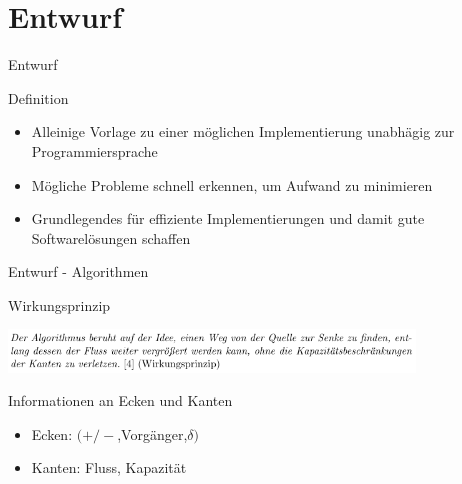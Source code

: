 \documentclass{beamer}
\begin{document}
    \section{Entwurf}
    \begin{frame}{Entwurf}
        \begin{block}{Definition}
            \begin{itemize}
                \item Alleinige Vorlage zu einer m\"oglichen Implementierung unabh\"agig zur Programmiersprache
                \item M\"ogliche Probleme schnell erkennen, um Aufwand zu minimieren
                \item Grundlegendes f\"ur effiziente Implementierungen und damit gute Softwarel\"osungen schaffen
            \end{itemize}
        \end{block}
    \end{frame}

    \begin{frame}{Entwurf - Algorithmen}
        \begin{block}{Wirkungsprinzip}
            \begin{center}
                \includegraphics[width=10.8cm]{../wirkungsprinzip.PNG}
            \end{center}
        \end{block}

        \begin{block}{Informationen an Ecken und Kanten}
            \begin{itemize}
                \item Ecken: $(+/-$,Vorg\"anger,$\delta)$
                \item Kanten: Fluss, Kapazit\"at
            \end{itemize}
        \end{block}
    \end{frame}
\end{document}
